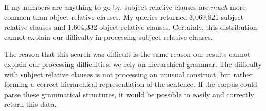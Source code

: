 \documentclass[doc,12pt]{apa6}
\begin{document}
If my numbers are anything to go by, subject relative clauses are \textit{much}
more common than object relative clauses. My queries returned 3,069,821 subject
relative clauses and 1,604,332 object relative clauses. Certainly, this
distribution cannot explain our difficulty in processing subject relative
clauses.

The reason that this search was difficult is the same reason our results cannot
explain our processing difficulties: we rely on hierarchical grammar. The
difficulty with subject relative clauses is not processing an unusual construct,
but rather forming a correct hierarchical representation of the sentence. If the
corpus could parse these grammatical structures, it would be possible to easily
and correctly return this data.

\end{document}
